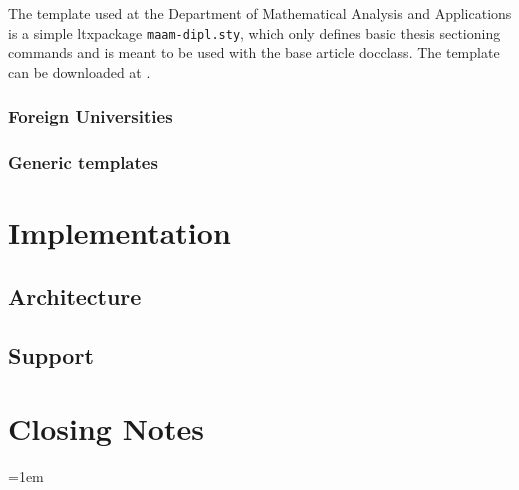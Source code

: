 \documentclass[12pt,twoside,cover,color,table]%
  {fithesis3/fithesis3/fithesis3} %
\begin{document}
  The template used at the
  Department of Mathematical Analysis and Applications is a simple
  \gls{ltxpackage} \texttt{maam-dipl.sty}, which only defines basic
  thesis sectioning commands and is meant to be used with the base
  article \gls{docclass}. The template can be downloaded at
  \cite{upol-maam-template}.


  \subsection{Foreign Universities}
  \subsection{Generic templates}


  \chapter{Implementation}
    \section{Architecture}
    \section{ Support}
  \chapter{Closing Notes}

  \newpage
  \nocite{*}
  \emergencystretch=1em
  \printbibliography[heading=bibintoc]
  \par

  \newpage
  \printglossaries

  \printindex
\end{document}
